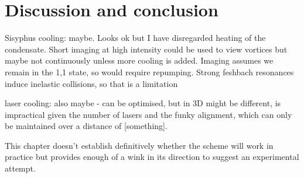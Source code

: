 
\section{Discussion and conclusion}

Sisyphus cooling: maybe. Looks ok but I have disregarded heating of the condensate. Short imaging at high intensity could be used to view vortices but maybe not continuously unless more cooling is added. Imaging assumes we remain in the 1,1 state, so would require repumping. Strong feshbach resonances induce inelastic collisions, so that is a limitation

laser cooling: also maybe - can be optimised, but in 3D might be different, is impractical given the number of lasers and the funky alignment, which can only be maintained over a distance of [something].

This chapter doesn't establish definitively whether the scheme will work in practice but provides enough of a wink in its direction to suggest an experimental attempt.
